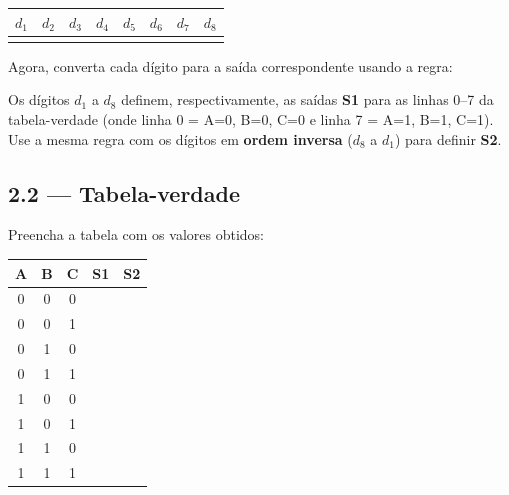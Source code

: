 \documentclass[12pt,a4paper]{article}
\newcommand{\celula}{\rule{0pt}{14pt}\hspace{12pt}}
\begin{document}
\begin{center}
\begin{tabular}{|c|c|c|c|c|c|c|c|}
\hline
$d_1$ & $d_2$ & $d_3$ & $d_4$ & $d_5$ & $d_6$ & $d_7$ & $d_8$ \\
\hline
\rule{0pt}{18pt}\hspace{10pt} & \hspace{10pt} & \hspace{10pt} & \hspace{10pt} & \hspace{10pt} & \hspace{10pt} & \hspace{10pt} & \hspace{10pt} \\
\hline
\end{tabular}
\end{center}

\noindent Agora, converta cada dígito para a saída correspondente usando a regra:

\begin{center}
\end{center}

\noindent Os dígitos $d_1$ a $d_8$ definem, respectivamente, as saídas \textbf{S1} para as linhas 0--7 da tabela-verdade (onde linha 0 = A=0, B=0, C=0 e linha 7 = A=1, B=1, C=1). Use a mesma regra com os dígitos em \textbf{ordem inversa} ($d_8$ a $d_1$) para definir \textbf{S2}.

\subsection{2.2 --- Tabela-verdade}

Preencha a tabela com os valores obtidos:

\begin{center}
\begin{tabular}{ccc|c|c}
\toprule
\textbf{A} & \textbf{B} & \textbf{C} & \textbf{S1} & \textbf{S2} \\
\midrule
0 & 0 & 0 & \celula & \celula \\
0 & 0 & 1 & \celula & \celula \\
0 & 1 & 0 & \celula & \celula \\
0 & 1 & 1 & \celula & \celula \\
1 & 0 & 0 & \celula & \celula \\
1 & 0 & 1 & \celula & \celula \\
1 & 1 & 0 & \celula & \celula \\
1 & 1 & 1 & \celula & \celula \\
\bottomrule
\end{tabular}
\end{center}
\end{document}
